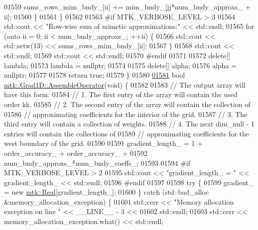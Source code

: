 \begin{DoxyCode}
{{01559       sums\_rows\_mim\_bndy\_[ii] += mim\_bndy\_[jj*num\_bndy\_approxs\_ + ii];
01560     \}
01561   \}
01562 
01563 \textcolor{preprocessor}{  #if MTK\_VERBOSE\_LEVEL > 3}
01564   std::cout << \textcolor{stringliteral}{"Row-wise sum of mimetic approximations:"} << std::endl;
01565   \textcolor{keywordflow}{for} (\textcolor{keyword}{auto} ii = 0; ii < num\_bndy\_approxs\_; ++ii) \{
01566     std::cout << std::setw(13) << sums\_rows\_mim\_bndy\_[ii];
01567   \}
01568   std::cout << std::endl;
01569   std::cout << std::endl;
01570 \textcolor{preprocessor}{  #endif}
01571 
01572   \textcolor{keyword}{delete}[] lambda;
01573   lambda = \textcolor{keyword}{nullptr};
01574 
01575   \textcolor{keyword}{delete}[] alpha;
01576   alpha = \textcolor{keyword}{nullptr};
01577 
01578   \textcolor{keywordflow}{return} \textcolor{keyword}{true};
01579 \}
01580 
\hypertarget{mtk__grad__1d_8cc_source_l01581}{}\hyperlink{classmtk_1_1Grad1D_a4eb4d363506b8c64b2bb18a318bbd259}{01581} \textcolor{keywordtype}{bool} \hyperlink{classmtk_1_1Grad1D_a4eb4d363506b8c64b2bb18a318bbd259}{mtk::Grad1D::AssembleOperator}(\textcolor{keywordtype}{void}) \{
01582 
01583   \textcolor{comment}{// The output array will have this form:}
01584   \textcolor{comment}{// 1. The first entry of the array will contain the used order kk.}
01585   \textcolor{comment}{// 2. The second entry of the array will contain the collection of}
01586   \textcolor{comment}{// approximating coefficients for the interior of the grid.}
01587   \textcolor{comment}{// 3. The third entry will contain a collection of weights.}
01588   \textcolor{comment}{// 4. The next dim\_null - 1 entries will contain the collections of}
01589   \textcolor{comment}{// approximating coefficients for the west boundary of the grid.}
01590 
01591   gradient\_length\_ = 1 + order\_accuracy\_ + order\_accuracy\_ +
01592     num\_bndy\_approxs\_*num\_bndy\_coeffs\_;
01593 
01594 \textcolor{preprocessor}{  #if MTK\_VERBOSE\_LEVEL > 2}
01595   std::cout << \textcolor{stringliteral}{"gradient\_length\_ = "} << gradient\_length\_ << std::endl;
01596 \textcolor{preprocessor}{  #endif}
01597 
01598   \textcolor{keywordflow}{try} \{
01599     gradient\_ = \textcolor{keyword}{new} \hyperlink{group__c01-roots_gac080bbbf5cbb5502c9f00405f894857d}{mtk::Real}[gradient\_length\_];
01600   \} \textcolor{keywordflow}{catch} (std::bad\_alloc &memory\_allocation\_exception) \{
01601     std::cerr << \textcolor{stringliteral}{"Memory allocation exception on line "} << \_\_LINE\_\_ - 3 <<
01602       std::endl;
01603     std::cerr << memory\_allocation\_exception.what() << std::endl;
}}
\end{DoxyCode}
